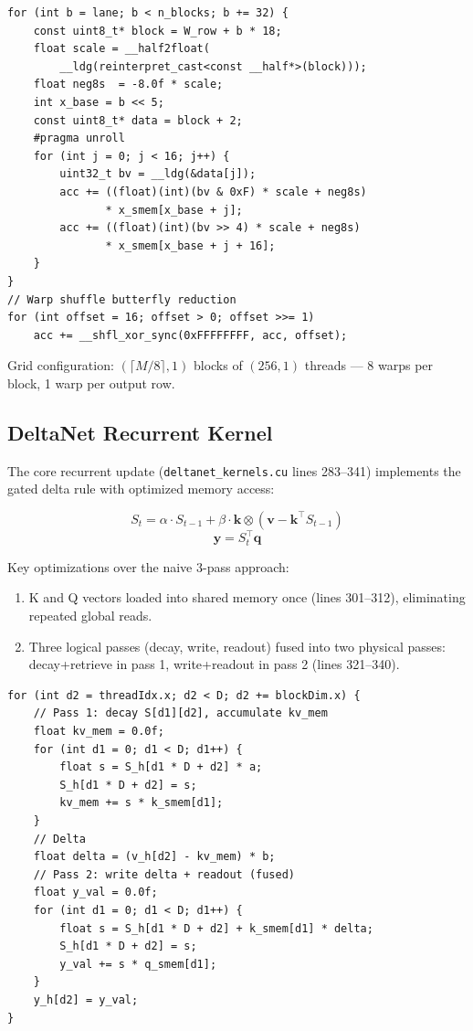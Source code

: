 \documentclass[11pt]{article}
\begin{document}
\begin{lstlisting}[caption={Q4\_0 GEMV core loop (deltanet\_kernels.cu:46--69)}]
for (int b = lane; b < n_blocks; b += 32) {
    const uint8_t* block = W_row + b * 18;
    float scale = __half2float(
        __ldg(reinterpret_cast<const __half*>(block)));
    float neg8s  = -8.0f * scale;
    int x_base = b << 5;
    const uint8_t* data = block + 2;
    #pragma unroll
    for (int j = 0; j < 16; j++) {
        uint32_t bv = __ldg(&data[j]);
        acc += ((float)(int)(bv & 0xF) * scale + neg8s)
               * x_smem[x_base + j];
        acc += ((float)(int)(bv >> 4) * scale + neg8s)
               * x_smem[x_base + j + 16];
    }
}
// Warp shuffle butterfly reduction
for (int offset = 16; offset > 0; offset >>= 1)
    acc += __shfl_xor_sync(0xFFFFFFFF, acc, offset);
\end{lstlisting}

Grid configuration: $(\lceil M/8 \rceil, 1)$ blocks of $(256, 1)$ threads ---
8 warps per block, 1 warp per output row.

\subsection{DeltaNet Recurrent Kernel}

The core recurrent update (\texttt{deltanet\_kernels.cu} lines 283--341) implements
the gated delta rule with optimized memory access:

\[
S_{t} = \alpha \cdot S_{t-1} + \beta \cdot \mathbf{k} \otimes (\mathbf{v} - \mathbf{k}^\top S_{t-1})
\]
\[
\mathbf{y} = S_t^\top \mathbf{q}
\]

Key optimizations over the naive 3-pass approach:

\begin{enumerate}
  \item K and Q vectors loaded into shared memory once (lines 301--312),
        eliminating repeated global reads.
  \item Three logical passes (decay, write, readout) fused into two physical
        passes: decay+retrieve in pass 1, write+readout in pass 2
        (lines 321--340).
\end{enumerate}

\begin{lstlisting}[caption={DeltaNet recurrent core (deltanet\_kernels.cu:319--340)}]
for (int d2 = threadIdx.x; d2 < D; d2 += blockDim.x) {
    // Pass 1: decay S[d1][d2], accumulate kv_mem
    float kv_mem = 0.0f;
    for (int d1 = 0; d1 < D; d1++) {
        float s = S_h[d1 * D + d2] * a;
        S_h[d1 * D + d2] = s;
        kv_mem += s * k_smem[d1];
    }
    // Delta
    float delta = (v_h[d2] - kv_mem) * b;
    // Pass 2: write delta + readout (fused)
    float y_val = 0.0f;
    for (int d1 = 0; d1 < D; d1++) {
        float s = S_h[d1 * D + d2] + k_smem[d1] * delta;
        S_h[d1 * D + d2] = s;
        y_val += s * q_smem[d1];
    }
    y_h[d2] = y_val;
}
\end{lstlisting}
\end{document}
